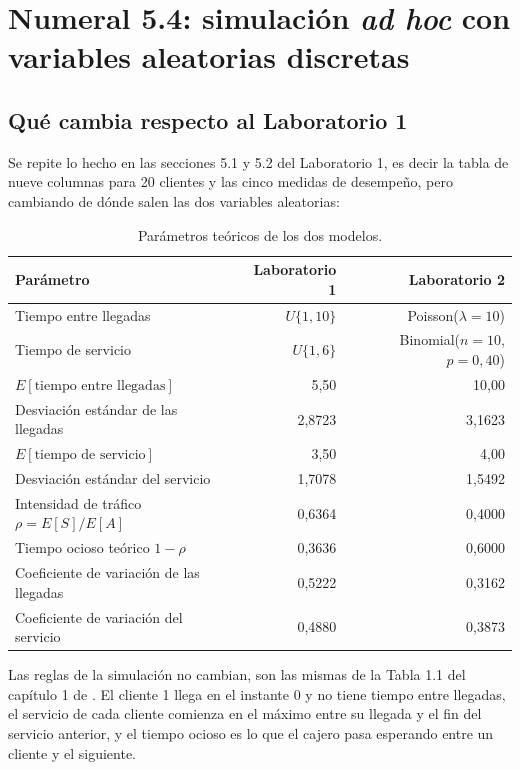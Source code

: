 \documentclass[11pt,letterpaper]{article}
\begin{document}
\section{Numeral 5.4: simulación \emph{ad hoc} con variables aleatorias discretas}

\subsection{Qué cambia respecto al Laboratorio 1}

Se repite lo hecho en las secciones 5.1 y 5.2 del Laboratorio 1, es decir la tabla de nueve columnas
para 20 clientes y las cinco medidas de desempeño, pero cambiando de dónde salen las dos variables
aleatorias:

\begin{table}[H]
\centering
\caption{Parámetros teóricos de los dos modelos.}
\label{tab:par}
\small
\begin{tabular}{@{}lrr@{}}
\toprule
Parámetro & Laboratorio 1 & Laboratorio 2 \\
\midrule
Tiempo entre llegadas & $U\{1,10\}$ & Poisson($\lambda = 10$) \\
Tiempo de servicio & $U\{1,6\}$ & Binomial($n=10$, $p=0{,}40$) \\
\addlinespace
$E[\text{tiempo entre llegadas}]$ & 5,50 & 10,00 \\
Desviación estándar de las llegadas & 2,8723 & 3,1623 \\
$E[\text{tiempo de servicio}]$ & 3,50 & 4,00 \\
Desviación estándar del servicio & 1,7078 & 1,5492 \\
\addlinespace
Intensidad de tráfico $\rho = E[S]/E[A]$ & 0,6364 & 0,4000 \\
Tiempo ocioso teórico $1-\rho$ & 0,3636 & 0,6000 \\
Coeficiente de variación de las llegadas & 0,5222 & 0,3162 \\
Coeficiente de variación del servicio & 0,4880 & 0,3873 \\
\bottomrule
\end{tabular}
\end{table}

Las reglas de la simulación no cambian, son las mismas de la Tabla 1.1 del capítulo 1 de
\cite{banks1998}. El cliente 1 llega en el instante 0 y no tiene tiempo entre llegadas, el servicio de
cada cliente comienza en el máximo entre su llegada y el fin del servicio anterior, y el tiempo
ocioso es lo que el cajero pasa esperando entre un cliente y el siguiente.
\end{document}

